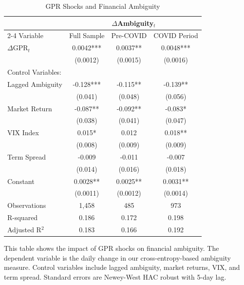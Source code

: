 \documentclass[preprint,12pt,authoryear]{elsarticle}
\begin{document}
\begin{table}[htbp]
\centering
\caption{GPR Shocks and Financial Ambiguity}
\label{tab:gpr_ambiguity}
\begin{threeparttable}
\begin{tabular*}{\textwidth}{@{\extracolsep{\fill}} lccc @{\extracolsep{\fill}}}
\toprule
& \multicolumn{3}{c}{$\Delta$Ambiguity$_t$} \\
\cmidrule(lr){2-4}
Variable & Full Sample & Pre-COVID & COVID Period \\
\midrule
\midrule
$\Delta$GPR$_t$ & 0.0042*** & 0.0037** & 0.0048*** \\
& (0.0012) & (0.0015) & (0.0016) \\
\midrule
Control Variables: & & & \\
Lagged Ambiguity & -0.128*** & -0.115** & -0.139** \\
& (0.041) & (0.048) & (0.056) \\
Market Return & -0.087** & -0.092** & -0.083* \\
& (0.038) & (0.041) & (0.047) \\
VIX Index & 0.015* & 0.012 & 0.018** \\
& (0.008) & (0.009) & (0.009) \\
Term Spread & -0.009 & -0.011 & -0.007 \\
& (0.014) & (0.016) & (0.018) \\
\midrule
Constant & 0.0028** & 0.0025** & 0.0031** \\
& (0.0011) & (0.0012) & (0.0014) \\
\midrule
Observations & 1,458 & 485 & 973 \\
R-squared & 0.186 & 0.172 & 0.198 \\
Adjusted R$^2$ & 0.183 & 0.166 & 0.192 \\
\bottomrule
\end{tabular*}
\begin{tablenotes}[flushleft]
\small
\item[] This table shows the impact of GPR shocks on financial ambiguity. The dependent variable is the daily change in our cross-entropy-based ambiguity measure. Control variables include lagged ambiguity, market returns, VIX, and term spread. Standard errors are Newey-West HAC robust with 5-day lag.
\end{tablenotes}
\end{threeparttable}
\end{table}
\end{document}
